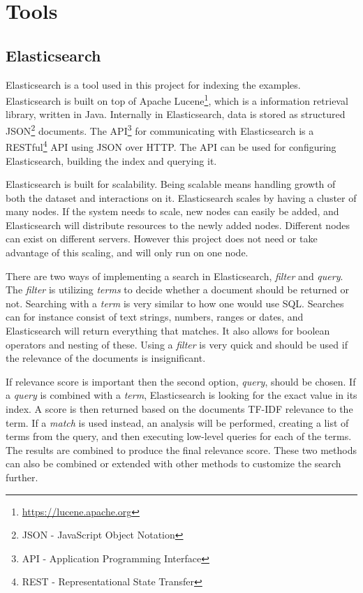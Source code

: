 \section{Tools}

\subsection{Elasticsearch} \label{elasticsearch}

Elasticsearch is a tool used in this project for indexing the examples. Elasticsearch is built on top of Apache Lucene\footnote{\url{https://lucene.apache.org}}, which is a information retrieval library, written in Java. Internally in Elasticsearch, data is stored as structured JSON\footnote{JSON - JavaScript Object Notation} documents. The API\footnote{API - Application Programming Interface} for communicating with Elasticsearch is a RESTful\footnote{REST - Representational State Transfer} API using JSON over HTTP. The API can be used for configuring Elasticsearch, building the index and querying it. 

Elasticsearch is built for scalability. Being scalable means handling growth of both  the dataset and interactions on it. Elasticsearch scales by having a cluster of many nodes. If the system needs to scale, new nodes can easily be added, and Elasticsearch will distribute resources to the newly added nodes. Different nodes can exist on different servers. However this project does not need or take advantage of this scaling, and will only run on one node.

There are two ways of implementing a search in Elasticsearch, \textit{filter} and \textit{query}. The \textit{filter} is utilizing \textit{terms} to decide whether a document should be returned or not. Searching with a \textit{term} is very similar to how one would use SQL. 
Searches can for instance consist of text strings, numbers, ranges or dates, and Elasticsearch will return everything that matches. It also allows for boolean operators and nesting of these. Using a \textit{filter} is very quick and should be used if the relevance of the documents is insignificant.

If relevance score is important then the second option, \textit{query}, should be chosen. If a \textit{query} is combined with a \textit{term}, Elasticsearch is looking for the exact value in its index. A score is then returned based on the documents TF-IDF relevance to the term. If a \textit{match} is used instead, an analysis will be performed, creating a list of terms from the query, and then executing low-level queries for each of the terms. The results are combined to produce the final relevance score. These two methods can also be combined or extended with other methods to customize the search further.


